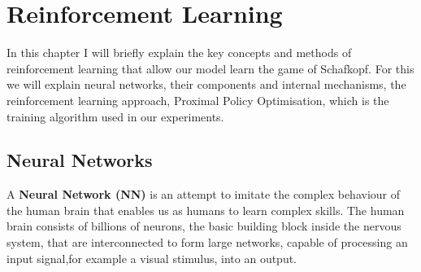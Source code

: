 \usepackage{amsmath}


\chapter{Reinforcement Learning}
In this chapter I will briefly explain the key concepts and methods of reinforcement learning that allow our model
learn the game of Schafkopf.
For this we will explain neural networks, their components and internal mechanisms, the reinforcement learning approach,
Proximal Policy Optimisation, which is the training algorithm used in our experiments.


\section{Neural Networks}
A \textbf{Neural Network (NN)} is an attempt to imitate the complex behaviour of the human brain that
enables us as humans to learn complex skills.
The human brain consists of billions of neurons, the basic building block inside the nervous system, that are
interconnected to form large networks, capable of processing an input signal,for example a visual stimulus, into an
output.\\

